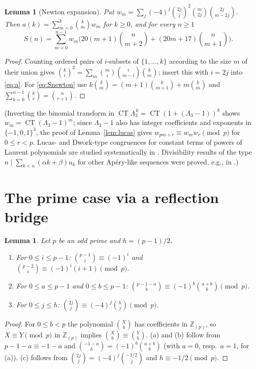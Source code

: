 \documentclass[11pt]{amsart}
\newtheorem{lemma}[theorem]{Lemma}
\theoremstyle{definition}
\newcommand{\Z}{\mathbb{Z}}
\newcommand{\CT}{\operatorname{CT}}
\begin{document}
\begin{lemma}[Newton expansion]\label{lem:newton}
Put $w_m=\sum_j(-4)^j\binom{2j}j^2\binom m{2j}\binom{2j}{m-2j}$. Then
$a(k)=\sum_{m=0}^k\binom kmw_m$ for $k\ge0$, and for every $n\ge1$
\begin{equation}\label{eq:Snewton}
S(n)=\sum_{m=0}^{n-1}w_m\Big(20(m+1)\binom n{m+2}+(20m+17)\binom n{m+1}\Big).
\end{equation}
\end{lemma}

\begin{proof}
Counting ordered pairs of $i$-subsets of $\{1,\dots,k\}$ according to the size $m$ of their union
gives $\binom ki^2=\sum_{m}\binom mi\binom i{m-i}\binom km$; insert this with $i=2j$ into
\eqref{eq:a}. For \eqref{eq:Snewton} use $k\binom km=(m+1)\binom k{m+1}+m\binom km$ and
$\sum_{k=0}^{n-1}\binom kr=\binom n{r+1}$.
\end{proof}

(Inverting the binomial transform in $\CT\Lambda_3^{\,k}=\CT(1+(\Lambda_3-1))^k$ shows
$w_m=\CT(\Lambda_3-1)^m$; since $\Lambda_3-1$ also has integer coefficients and exponents in
$\{-1,0,1\}^3$, the proof of Lemma~\ref{lem:lucas} gives $w_{pm+r}\equiv w_mw_r\pmod p$ for
$0\le r<p$. Lucas- and Dwork-type congruences
for constant terms of powers of Laurent polynomials are studied systematically in \cite{MV,BV1}.
Divisibility results of the type $n\mid\sum_{k<n}(\alpha k+\beta)u_k$ for other Ap\'ery-like
sequences were proved, e.g., in \cite{GZ,SunEJC}.)

\section{The prime case via a reflection bridge}

\begin{lemma}\label{lem:elem}
Let $p$ be an odd prime and $h=(p-1)/2$.
\begin{enumerate}[label=(\alph*)]
\item For $0\le i\le p-1$: $\binom{p-1}i\equiv(-1)^i$ and $\binom{p-2}i\equiv(-1)^i(i+1)\pmod p$.
\item For $0\le a\le p-1$ and $0\le b\le p-1$: $\binom{p-1-a}b\equiv(-1)^b\binom{a+b}b\pmod p$.
\item For $0\le j\le h$: $\binom{2j}j\equiv(-4)^j\binom hj\pmod p$.
\end{enumerate}
\end{lemma}

\begin{proof}
For $0\le b<p$ the polynomial $\binom Xb$ has coefficients in $\Z_{(p)}$, so $X\equiv Y\pmod p$ in
$\Z_{(p)}$ implies $\binom Xb\equiv\binom Yb$. (a) and (b) follow from $p-1-a\equiv-1-a$ and
$\binom{-1-a}b=(-1)^b\binom{a+b}b$ (with $a=0$, resp.\ $a=1$, for (a)). (c) follows from
$\binom{2j}j=(-4)^j\binom{-1/2}j$ and $h\equiv-1/2\pmod p$.
\end{proof}
\end{document}
